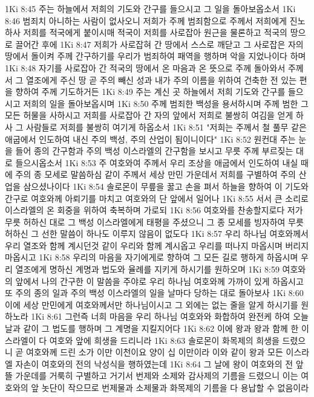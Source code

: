 1Ki 8:45  주는 하늘에서 저희의 기도와 간구를 들으시고 그 일을 돌아보옵소서
1Ki 8:46  범죄치 아니하는 사람이 없사오니 저희가 주께 범죄함으로 주께서 저희에게 진노하사 저희를 적국에게 붙이시매 적국이 저희를 사로잡아 원근을 물론하고 적국의 땅으로 끌어간 후에
1Ki 8:47  저희가 사로잡혀 간 땅에서 스스로 깨닫고 그 사로잡은 자의 땅에서 돌이켜 주께 간구하기를 우리가 범죄하여 패역을 행하며 악을 지었나이다 하며
1Ki 8:48  자기를 사로잡아 간 적국의 땅에서 온 마음과 온 뜻으로 주께 돌아와서 주께서 그 열조에게 주신 땅 곧 주의 빼신 성과 내가 주의 이름을 위하여 건축한 전 있는 편을 향하여 주께 기도하거든
1Ki 8:49  주는 계신 곳 하늘에서 저희 기도와 간구를 들으시고 저희의 일을 돌아보옵시며
1Ki 8:50  주께 범죄한 백성을 용서하시며 주께 범한 그 모든 허물을 사하시고 저희를 사로잡아 간 자의 앞에서 저희로 불쌍히 여김을 얻게 하사 그 사람들로 저희를 불쌍히 여기게 하옵소서
1Ki 8:51  "저희는 주께서 철 풀무 같은 애굽에서 인도하여 내신 주의 백성, 주의 산업이 됨이니이다"
1Ki 8:52  원컨대 주는 눈을 들어 종의 간구함과 주의 백성 이스라엘의 간구함을 보시고 무릇 주께 부르짖는 대로 들으시옵소서
1Ki 8:53  주 여호와여 주께서 우리 조상을 애굽에서 인도하여 내실 때에 주의 종 모세로 말씀하심 같이 주께서 세상 만민 가운데서 저희를 구별하여 주의 산업을 삼으셨나이다
1Ki 8:54  솔로몬이 무릎을 꿇고 손을 펴서 하늘을 향하여 이 기도와 간구로 여호와께 아뢰기를 마치고 여호와의 단 앞에서 일어나
1Ki 8:55  서서 큰 소리로 이스라엘의 온 회중을 위하여 축복하며 가로되
1Ki 8:56  여호와를 찬송할지로다 저가 무릇 허하신 대로 그 백성 이스라엘에게 태평을 주셨으니 그 종 모세를 빙자하여 무릇 허하신 그 선한 말씀이 하나도 이루지 않음이 없도다
1Ki 8:57  우리 하나님 여호와께서 우리 열조와 함께 계시던것 같이 우리와 함께 계시옵고 우리를 떠나지 마옵시며 버리지 마옵시고
1Ki 8:58  우리의 마음을 자기에게로 향하여 그 모든 길로 행하게 하옵시며 우리 열조에게 명하신 계명과 법도와 율례를 지키게 하시기를 원하오며
1Ki 8:59  여호와의 앞에서 나의 간구한 이 말씀을 주야로 우리 하나님 여호와께 가까이 있게 하옵시고 또 주의 종의 일과 주의 백성 이스라엘의 일을 날마다 당하는 대로 돌아보사
1Ki 8:60  이에 세상 만민에게 여호와께서만 하나님이시고 그 외에는 없는 줄을 알게 하시기를 원하노라
1Ki 8:61  그런즉 너희 마음을 우리 하나님 여호와와 화합하여 완전케 하여 오늘날과 같이 그 법도를 행하며 그 계명을 지킬지어다
1Ki 8:62  이에 왕과 왕과 함께 한 이스라엘이 다 여호와 앞에 희생을 드리니라
1Ki 8:63  솔로몬이 화목제의 희생을 드렸으니 곧 여호와께 드린 소가 이만 이천이요 양이 십 이만이라 이와 같이 왕과 모든 이스라엘 자손이 여호와의 전의 낙성식을 행하였는데
1Ki 8:64  그 날에 왕이 여호와의 전 앞뜰 가운데를 거룩히 구별하고 거기서 번제와 소제와 감사제의 기름을 드렸으니 이는 여호와의 앞 놋단이 작으므로 번제물과 소제물과 화목제의 기름을 다 용납할 수 없음이라
